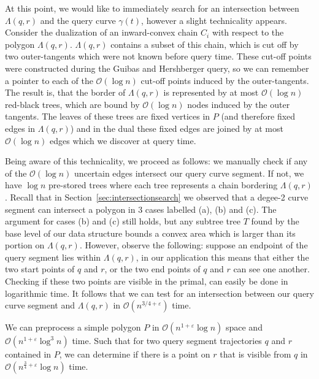 \documentclass[a4paper, UKenglish]{lipics-v2018}
\begin{document}
At this point, we would like to immediately search for an intersection between $\Lambda(q,r)$ and the query curve $\gamma(t)$, however a slight technicality appears. Consider the dualization of an inward-convex chain $C_i$ with respect to the polygon $\Lambda(q,r)$. $\Lambda(q,r)$ contains a subset of this chain, which is cut off by two outer-tangents which were not known before query time. These cut-off points were constructed during the Guibas and Hershberger query, so we can remember a pointer to each of the $\mathcal{O}(\log n)$ cut-off points induced by the outer-tangents. The result is, that the border of $\Lambda(q,r)$ is represented by at most $\mathcal{O}(\log n)$ red-black trees, which are bound by $\mathcal{O}(\log n)$ nodes induced by the outer tangents. The leaves of these trees are fixed vertices in $P$ (and therefore fixed edges in $\Lambda(q,r)$) and in the dual these fixed edges are joined by at most $\mathcal{O}(\log n)$ edges which we discover at query time.

Being aware of this technicality, we proceed as follows: we manually check if any of the $\mathcal{O}(\log n)$ uncertain edges intersect our query curve segment. If not, we have $\log n$ pre-stored trees where each tree represents a chain bordering $\Lambda(q,r)$. Recall that in Section~\ref{sec:intersectionsearch} we observed that a degee-2 curve segment can intersect a polygon in 3 cases labelled (a), (b) and (c). The argument for cases (b) and (c) still holds, but any subtree tree $T$ found by the base level of our data structure bounds a convex area which is larger than its portion on $\Lambda(q,r)$. However, observe the following: suppose an endpoint of the query segment lies within $\Lambda(q,r)$, in our application this means that either the two start points of $q$ and $r$, or the two end points of $q$ and $r$ can see one another. Checking if these two points are visible in the primal, can easily be done in logarithmic time. It follows that we can test for an intersection between our query curve segment and $\Lambda(q,r)$ in $\mathcal{O}(n^{3/4 + \varepsilon})$ time.

\begin{theorem}
    We can preprocess a simple polygon $P$ in $\mathcal{O}(n^{1 + \varepsilon} \log n )$ space and $\mathcal{O}(n^{1 + \varepsilon} \log^3 n)$ time. Such that for two query segment trajectories $q$ and $r$ contained in $P$, we can determine if there is a point on $r$ that is visible from $q$ in $\mathcal{O}(n^{\frac{3}{4} + \varepsilon} \log n)$ time.
\end{theorem}
\end{document}
